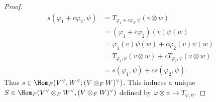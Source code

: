 \documentclass[10pt,twoside,openany]{memoir}
\begin{document}
\begin{proof}
                \begin{equation*}
                \begin{split}
                    s(\varphi_1 + c \varphi_2,\psi)
                    & = T_{\varphi_1 + c\varphi_2,\psi}(v \otimes w) \\
                    & = (\varphi_1 + c\varphi_2)(v)\psi(w) \\
                    & = \varphi_1(v)\psi(w) + c\varphi_2(v)\psi(w) \\
                    & = T_{\varphi_1,\psi}(v \otimes w) + cT_{\varphi_2,\psi}(v \otimes w) \\
                    & = s(\varphi_1,\psi) + c s(\varphi_2,\psi).
                \end{split}
                \end{equation*}
            Thus $s \in \Hom_F(V^\vee,W^\vee;(V \otimes_F W)^\vee )$. This induces a unique $S \in \Hom_F(V^\vee \otimes_F W^\vee, (V \otimes_F W)^\vee)$ defined by $\varphi \otimes \psi \mapsto T_{\varphi,\psi}$.


\end{proof}
\end{document}

